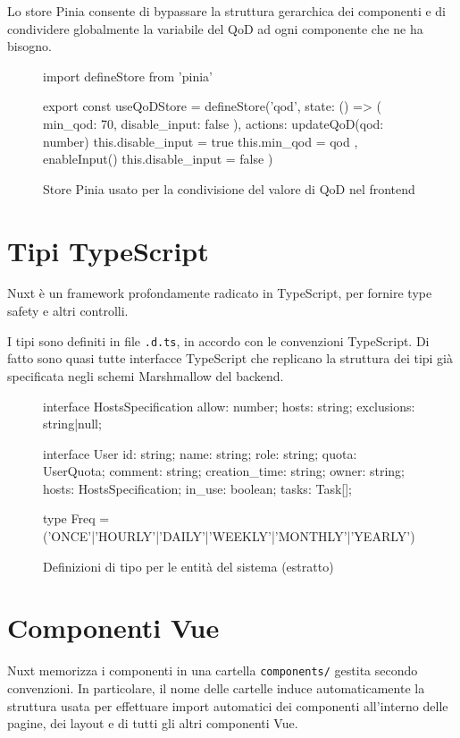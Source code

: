 Lo store Pinia consente di bypassare la struttura gerarchica dei componenti e di condividere globalmente la variabile del QoD ad ogni componente che ne ha bisogno.

\begin{figure}
\centering
\begin{jscode}
import { defineStore } from 'pinia'

export const useQoDStore = defineStore('qod', {
  state: () => ({ min_qod: 70, disable_input: false }),
  actions: {
    updateQoD(qod: number) {
      this.disable_input = true
      this.min_qod = qod
    },
    enableInput() {
      this.disable_input = false
    }
  }
})
\end{jscode}
\caption{Store Pinia usato per la condivisione del valore di QoD nel frontend}
\end{figure}

\section{Tipi TypeScript}
Nuxt è un framework profondamente radicato in TypeScript, per fornire type safety e altri controlli.

I tipi sono definiti in file \texttt{.d.ts}, in accordo con le convenzioni TypeScript. Di fatto sono quasi tutte interfacce TypeScript che replicano la struttura dei tipi già specificata negli schemi Marshmallow del backend.

\begin{figure}
\centering
\begin{jscode}
interface HostsSpecification {
  allow: number;
  hosts: string;
  exclusions: string|null;
}
  
interface User {
  id: string;
  name: string;
  role: string;
  quota: UserQuota;
  comment: string;
  creation_time: string;
  owner: string;
  hosts: HostsSpecification;
  in_use: boolean;
  tasks: Task[];
}
  
type Freq = ('ONCE'|'HOURLY'|'DAILY'|'WEEKLY'|'MONTHLY'|'YEARLY')
\end{jscode}
\caption{Definizioni di tipo per le entità del sistema (estratto)}
\end{figure}

\section{Componenti Vue}
Nuxt memorizza i componenti in una cartella \texttt{components/} gestita secondo convenzioni. In particolare, il nome delle cartelle induce automaticamente la struttura usata per effettuare import automatici dei componenti all'interno delle pagine, dei layout e di tutti gli altri componenti Vue.

